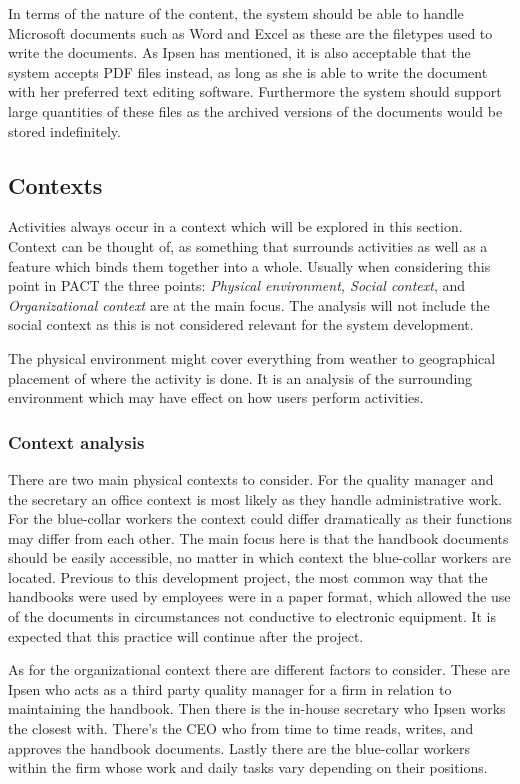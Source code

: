 In terms of the nature of the content, the system should be able to handle Microsoft documents such as Word and Excel as these are the filetypes used to write the documents.
As Ipsen has mentioned, it is also acceptable that the system accepts PDF files instead, as long as she is able to write the document with her preferred text editing software.
Furthermore the system should support large quantities of these files as the archived versions of the documents would be stored indefinitely.

\subsection{Contexts}
Activities always occur in a context which will be explored in this section.
Context can be thought of, as something that surrounds activities as well as a feature which binds them together into a whole.
Usually when considering this point in PACT the three points: \textit{Physical environment, Social context}, and \textit{Organizational context} are at the main focus.
The analysis will not include the social context as this is not considered relevant for the system development.

The physical environment might cover everything from weather to geographical placement of where the activity is done.
It is an analysis of the surrounding environment which may have effect on how users perform activities.

\subsubsection*{Context analysis}
There are two main physical contexts to consider.
For the quality manager and the secretary an office context is most likely as they handle administrative work.
For the blue-collar workers the context could differ dramatically as their functions may differ from each other.
The main focus here is that the handbook documents should be easily accessible, no matter in which context the blue-collar workers are located.
Previous to this development project, the most common way that the handbooks were used by employees were in a paper format, which allowed the use of the documents in circumstances not conductive to electronic equipment.
It is expected that this practice will continue after the project.

As for the organizational context there are different factors to consider.
These are Ipsen who acts as a third party quality manager for a firm in relation to maintaining the handbook.
Then there is the in-house secretary who Ipsen works the closest with.
There's the CEO who from time to time reads, writes, and approves the handbook documents.
Lastly there are the blue-collar workers within the firm whose work and daily tasks vary depending on their positions.

